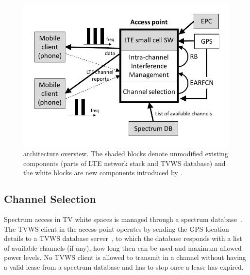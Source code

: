 

\begin{figure}[htb]
  \centering
    \vspace{-12pt}
    \includegraphics[width=\columnwidth]{./figs/architecture}
    \vspace{-0.3in}
    \caption{\cf architecture overview. The shaded blocks denote unmodified existing components (parts of LTE network stack and TVWS database) and the white blocks are new components introduced by \cf. }
  \label{fig:arch}
\end{figure}




\subsection{Channel Selection}

Spectrum access in TV white spaces is managed through a spectrum database~\cite{fcc_db, ofcom_db}. 
The TVWS client in the \cf access point operates by sending the GPS location details to a TVWS database server~\cite{paws},
to which the database responds with a list of available channels (if any), how long then can be used and maximum allowed power levels.  
No TVWS client is allowed to transmit in a channel without having a valid lease from a spectrum database and has to stop once a lease has expired.

